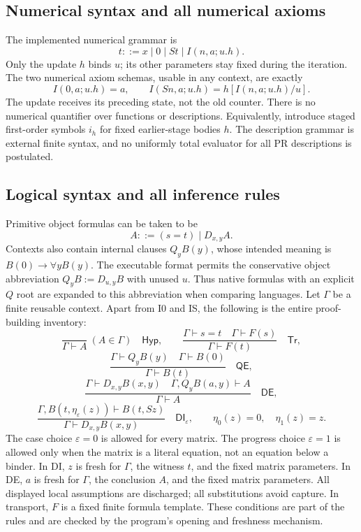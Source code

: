 \subsection{Numerical syntax and all numerical axioms}

The implemented numerical grammar is
\[
 t::=x\mid0\mid St\mid I(n,a;u.h).
\]
Only the update $h$ binds $u$; its other parameters stay fixed during
the iteration. The two numerical axiom schemas, usable in any context,
are exactly
\[
 I(0,a;u.h)=a,\qquad
 I(Sn,a;u.h)=h[I(n,a;u.h)/u].
 \tag{I0, IS}
\]
The update receives its preceding state, not the old counter.
There is no numerical quantifier over functions or descriptions.
Equivalently, introduce staged first-order symbols $i_h$ for fixed
earlier-stage bodies $h$. The description grammar is external finite
syntax, and no uniformly total evaluator for all PR descriptions is
postulated.

\subsection{Logical syntax and all inference rules}

Primitive object formulas can be taken to be
\[
 A::=(s=t)\mid D_{x,y}A.
\]
Contexts also contain internal clauses $Q_yB(y)$, whose intended
meaning is $B(0)\to\forall yB(y)$. The executable format permits the
conservative object abbreviation
$Q_yB:=D_{u,y}B$ with unused $u$. Thus native formulas with an explicit
$Q$ root are expanded to this abbreviation when comparing languages.
Let $\Gamma$ be a finite reusable context. Apart from I0 and IS, the
following is the entire proof-building inventory:
\[
 \frac{}{\Gamma\vdash A}\ (A\in\Gamma)\quad\mathsf{Hyp},
 \qquad
 \frac{\Gamma\vdash s=t\quad\Gamma\vdash F(s)}
      {\Gamma\vdash F(t)}\quad\mathsf{Tr},
\]
\[
 \frac{\Gamma\vdash Q_yB(y)\quad\Gamma\vdash B(0)}
      {\Gamma\vdash B(t)}\quad\mathsf{QE},
\]
\[
 \frac{\Gamma\vdash D_{x,y}B(x,y)\quad
       \Gamma,Q_yB(a,y)\vdash A}
      {\Gamma\vdash A}\quad\mathsf{DE},
\]
\[
 \frac{\Gamma,B(t,\eta_\varepsilon(z))\vdash B(t,Sz)}
      {\Gamma\vdash D_{x,y}B(x,y)}\quad\mathsf{DI}_\varepsilon,
 \qquad \eta_0(z)=0,\quad\eta_1(z)=z.
 \tag{Choice DI}
\]
The case choice $\varepsilon=0$ is allowed for every matrix. The
progress choice $\varepsilon=1$ is allowed only when the matrix is
a literal equation, not an equation below a binder. In DI, $z$ is
fresh for $\Gamma$, the witness $t$, and the fixed matrix parameters.
In DE, $a$ is fresh for $\Gamma$, the conclusion $A$, and the fixed
matrix parameters. All displayed local assumptions are discharged;
all substitutions avoid capture. In transport, $F$ is a fixed finite
formula template. These conditions are part of the rules and are
checked by the program's opening and freshness mechanism.

